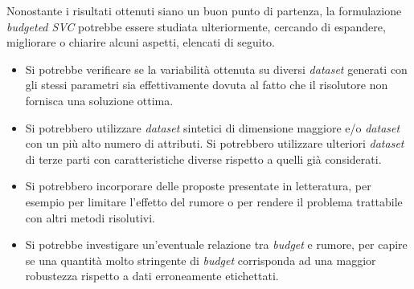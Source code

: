 Nonostante i risultati ottenuti siano un buon punto di partenza, la formulazione \emph{budgeted SVC} potrebbe essere studiata ulteriormente, cercando di espandere, migliorare o chiarire alcuni aspetti, elencati di seguito.
\begin{itemize}
    \item Si potrebbe verificare se la variabilità ottenuta su diversi \emph{dataset} generati con gli stessi parametri sia effettivamente dovuta al fatto che il risolutore non fornisca una soluzione ottima. 
    \item Si potrebbero utilizzare \emph{dataset} sintetici di dimensione maggiore e/o \emph{dataset} con un più alto numero di attributi. Si potrebbero utilizzare ulteriori \emph{dataset} di terze parti con caratteristiche diverse rispetto a quelli già considerati.
    \item Si potrebbero incorporare delle proposte presentate in letteratura, per esempio per limitare l'effetto del rumore o per rendere il problema trattabile con altri metodi risolutivi.
    \item Si potrebbe investigare un'eventuale relazione tra \emph{budget} e rumore, per capire se una quantità molto stringente di \emph{budget} corrisponda ad una maggior robustezza rispetto a dati erroneamente etichettati.
\end{itemize}

